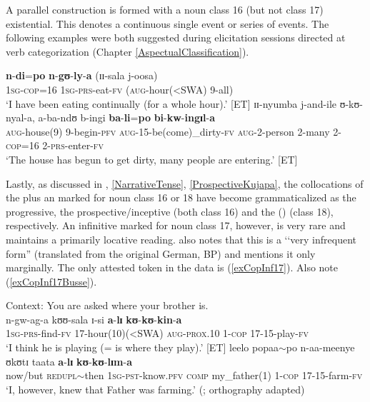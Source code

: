 A parallel construction is formed with a noun class 16 (but not class 17) existential. This denotes a continuous single event or series of events. The following examples were both suggested during elicitation sessions directed at verb categorization (Chapter \ref{AspectualClassification}).

\begin{exe}
\ex\gll \textbf{n}-\textbf{di}=\textbf{po} \textbf{n}-\textbf{gʊ}-\textbf{ly}-\textbf{a} (ɪɪ-sala j-oosa)\\
\textsc{1sg}-\textsc{cop}=16 \textsc{1sg}-\textsc{prs}-eat-\textsc{fv} (\textsc{aug}-hour(<SWA) 9-all)\\
\glt \lq I have been eating continually (for a whole hour).' [ET]
\ex \gll ɪɪ-nyumba j-and-ile ʊ-kʊ-nyal-a, a-ba-ndʊ b-ingi \textbf{ba}-\textbf{li}=\textbf{po} \textbf{bi}-\textbf{kw}-\textbf{ingɪl}-\textbf{a}\\
\textsc{aug}-house(9) 9-begin-\textsc{pfv} \textsc{aug}-15-be(come)\_dirty-\textsc{fv} \textsc{aug}-2-person 2-many 2-\textsc{cop}=16 2-\textsc{prs}-enter-\textsc{fv}\\
\glt \lq The house has begun to get dirty, many people are entering.' [ET]
\end{exe}

Lastly, as discussed in , \ref{NarrativeTense}, \ref{ProspectiveKujapa}, the collocations of the  plus an  marked for  noun class 16 or 18 have become grammaticalized as the progressive, the prospective/inceptive (both class 16) and the  () (class 18), respectively. An infinitive marked for  noun class 17, however, is very rare and maintains a primarily locative reading. \citet[23]{SchumannK1899} also notes that this is a \lq\lq very infrequent form'' (translated from the original German, BP) and \citet{EndemannC1914} mentions it only marginally. The only attested token in the data is (\ref{exCopInf17}). Also note (\ref{exCopInf17Busse}).

\begin{exe}
\ex \label{exCopInf17}Context: You are asked where your brother is.\\
\gll n-gw-ag-a kʊʊ-sala ɪ-si \textbf{a}-\textbf{lɪ} \textbf{kʊ}-\textbf{kʊ}-\textbf{kin}-\textbf{a}\\
\textsc{1sg}-\textsc{prs}-find-\textsc{fv} 17-hour(10)(<SWA) \textsc{aug}-\textsc{prox.10} 1-\textsc{cop} 17-15-play-\textsc{fv}\\
\glt \lq I think he is playing (= is where they play).' [ET]
\ex \label{exCopInf17Busse}
\gll leelo popaa$\sim$po n-aa-meenye ʊkʊtɪ taata \textbf{a}-\textbf{lɪ} \textbf{kʊ}-\textbf{kʊ}-\textbf{lɪm}-\textbf{a}\\
now/but \textsc{redupl}$\sim$then \textsc{1sg}-\textsc{pst}-know.\textsc{pfv} \textsc{comp} my\_father(1) 1-\textsc{cop} 17-15-farm-\textsc{fv}\\ \largerpage
\glt \lq I, however, knew that Father was farming.' (\citealt[204]{BusseJ1949}; orthography adapted)
\end{exe}

